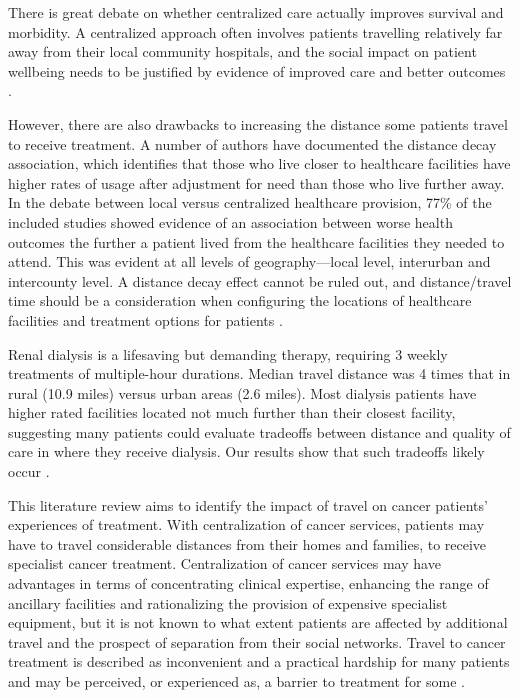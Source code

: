 There is great debate on whether centralized care actually improves survival and morbidity. A centralized approach often involves patients travelling relatively far away from their local community hospitals, and the social impact on patient wellbeing needs to be justified by evidence of improved care and better outcomes \cite{woo_centralisation_2012}.

However, there are also drawbacks to increasing the distance some patients travel to receive treatment. A number of authors have documented the distance decay association, which identifies that those who live closer to healthcare facilities have higher rates of usage after adjustment for need than those who live further away. In the debate between local versus centralized healthcare provision, 77\% of the included studies showed evidence of an association between worse health outcomes the further a patient lived from the healthcare facilities they needed to attend. This was evident at all levels of geography—local level, interurban and intercounty level. A distance decay effect cannot be ruled out, and distance/travel time should be a consideration when configuring the locations of healthcare facilities and treatment options for patients \cite{kelly_are_2016}.

Renal dialysis is a lifesaving but demanding therapy, requiring 3 weekly treatments of multiple-hour durations. Median travel distance was 4 times that in rural (10.9 miles) versus urban areas (2.6 miles). Most dialysis patients have higher rated facilities located not much further than their closest facility, suggesting many patients could evaluate tradeoffs between distance and quality of care in where they receive dialysis. Our results show that such tradeoffs likely occur \cite{salerno_understanding_2022}.

This literature review aims to identify the impact of travel on cancer patients' experiences of treatment. With centralization of cancer services, patients may have to travel considerable distances from their homes and families, to receive specialist cancer treatment. Centralization of cancer services may have advantages in terms of concentrating clinical expertise, enhancing the range of ancillary facilities and rationalizing the provision of expensive specialist equipment, but it is not known to what extent patients are affected by additional travel and the prospect of separation from their social networks. Travel to cancer treatment is described as inconvenient and a practical hardship for many patients and may be perceived, or experienced as, a barrier to treatment for some \cite{payne_impact_2000}.


